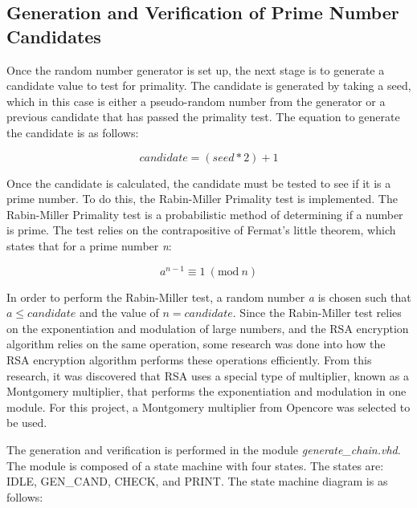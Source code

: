 \documentclass[journal]{IEEEtran}
\begin{document}
\subsection{Generation and Verification of Prime Number Candidates}
Once the random number generator is set up, the next stage is to generate a candidate value to test for primality. The candidate is generated by taking a seed, which in this case is either a pseudo-random number from the generator or a previous candidate that has passed the primality test. The equation to generate the candidate is as follows: 

\begin{displaymath}
candidate = (seed * 2) + 1
\end{displaymath}

Once the candidate is calculated, the candidate must be tested to see if it is a prime number. To do this, the Rabin-Miller Primality test is implemented. The Rabin-Miller Primality test is a probabilistic method of determining if a number is prime. The test relies on the contrapositive of Fermat's little theorem, which states that for a prime number \textit{n}:

\begin{displaymath}
a^{n-1} \equiv 1\ (\textrm{mod}\ n)
\end{displaymath}

In order to perform the Rabin-Miller test, a random number \textit{a} is chosen such that $a \le candidate$ and the value of $n = candidate$. Since the Rabin-Miller test relies on the exponentiation and modulation of large numbers, and the RSA encryption algorithm relies on the same operation, some research was done into how the RSA encryption algorithm performs these operations efficiently. From this research, it was discovered that RSA uses a special type of multiplier, known as a Montgomery multiplier, that performs the exponentiation and modulation in one module. For this project, a Montgomery multiplier from Opencore was selected to be used.

The generation and verification is performed in the module \textit{generate\_chain.vhd}. The module is composed of a state machine with four states. The states are: IDLE, GEN\_CAND, CHECK, and PRINT. The state machine diagram is as follows:
\end{document}
